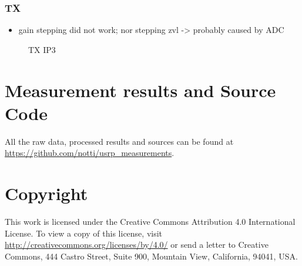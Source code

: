 \documentclass[12pt,a4paper,parskip=full]{scrartcl}
\begin{document}
\subsubsection{TX}
\begin{itemize}
    \item gain stepping did not work; nor stepping zvl -> probably caused by ADC
\end{itemize}
\begin{figure}[htb]
    \centering
{}
    \caption{TX IP3}
    \label{fig:txip3}
\end{figure}

\clearpage
\begin{appendix}
\section*{Measurement results and Source Code}
\label{sec:sources}
All the raw data, processed results and sources can be found at
\url{https://github.com/notti/usrp_measurements}.
\section*{Copyright}
This work is licensed under the Creative Commons Attribution 4.0 International
License. To view a copy of this license, visit
\url{http://creativecommons.org/licenses/by/4.0/} or send a letter to Creative
Commons, 444 Castro Street, Suite 900, Mountain View, California, 94041, USA.
\listoffigures


\end{appendix}
\end{document}
